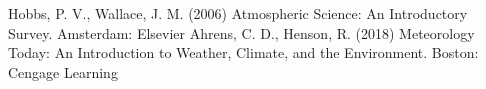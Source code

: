 \documentclass{trkut}%
\begin{document}

Hobbs, P. V., Wallace, J. M. (2006) Atmospheric Science: An Introductory Survey. Amsterdam: Elsevier \newline
Ahrens, C. D., Henson, R. (2018) Meteorology Today: An Introduction to Weather, Climate, and the Environment. Boston: Cengage Learning




\kinnitusleht%
\end{document}
